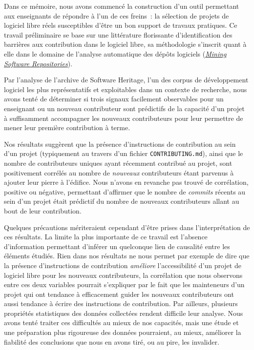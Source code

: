 \documentclass[dvipsnames]{llncs}
\newcommand{\en}[1]{\foreignlanguage{english}{\emph{#1}}}
\begin{document}
    Dans ce mémoire, nous avons commencé la construction d'un outil permettant aux enseignants de répondre à
    l'un de ces freins : la sélection de projets de logiciel libre réels susceptibles d'être un bon support de
    travaux pratiques. Ce travail préliminaire se base sur une littérature florissante d'identification des
    barrières aux contribution dans le logiciel libre, sa méthodologie s'inscrit quant à elle dans le domaine
    de l'analyse automatique des dépôts logiciels (\href{https://conf.researchr.org/series/msr}{\en{Mining
    Software Repositories}}).

    Par l'analyse de l'archive de Software Heritage, l'un des corpus de développement logiciel les plus
    représentatifs et exploitables dans un contexte de recherche, nous avons tenté de déterminer si trois
    signaux facilement observables pour un enseignant ou un nouveau contributeur sont prédictifs de la
    capacité d'un projet à suffisamment accompagner les nouveaux contributeurs pour leur permettre de mener
    leur première contribution à terme.

    Nos résultats suggèrent que la présence d'instructions de contribution au sein d'un projet (typiquement au
    travers d'un fichier \texttt{CONTRIBUTING.md}), ainsi que le nombre de contributeurs uniques ayant
    récemment contribué au projet, sont positivement corrélés au nombre de \emph{nouveaux} contributeurs étant
    parvenus à ajouter leur pierre à l'édifice. Nous n'avons en revanche pas trouvé de corrélation, positive
    ou négative, permettant d'affirmer que le nombre de \en{commits} récents au sein d'un projet était
    prédictif du nombre de nouveaux contributeurs allant au bout de leur contribution.

    Quelques précautions mériteraient cependant d'être prises dans l'interprétation de ces résultats. La
    limite la plus importante de ce travail est l'absence d'information permettant d'inférer un quelconque
    lien de causalité entre les éléments étudiés. Rien dans nos résultats ne nous permet par exemple de dire
    que la présence d'instructions de contribution \emph{améliore} l'accessibilité d'un projet de logiciel
    libre pour les nouveaux contributeurs, la corrélation que nous observons entre ces deux variables pourrait
    s'expliquer par le fait que les mainteneurs d'un projet qui ont tendance à efficacement guider les
    nouveaux contributeurs ont aussi tendance à écrire des instructions de contribution. Par ailleurs,
    plusieurs propriétés statistiques des données collectées rendent difficile leur analyse. Nous avons tenté
    traiter ces difficultés au mieux de nos capacités, mais une étude et une préparation plus rigoureuse des
    données pourraient, au mieux, améliorer la fiabilité des conclusions que nous en avons tiré, ou au pire,
    les invalider.
\end{document}
